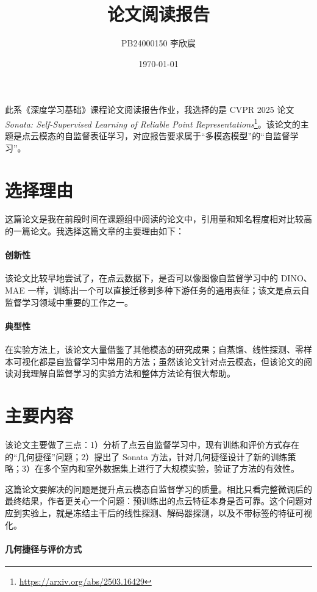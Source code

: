 \documentclass[a4paper,fontset=mac]{ctexart}
\title{论文阅读报告}
\author{PB24000150 李欣宸}
\date{\today}
\begin{document}
\maketitle

此系《深度学习基础》课程论文阅读报告作业，我选择的是 CVPR 2025 论文 {\it Sonata: Self-Supervised Learning of Reliable Point Representations}\footnote{\url{https://arxiv.org/abs/2503.16429}}。该论文的主题是点云模态的自监督表征学习，对应报告要求属于“多模态模型”的“自监督学习”。

\section{选择理由}

这篇论文是我在前段时间在课题组中阅读的论文中，引用量和知名程度相对比较高的一篇论文。我选择这篇文章的主要理由如下：

\paragraph{创新性} 该论文比较早地尝试了，在点云数据下，是否可以像图像自监督学习中的 DINO、MAE 一样，训练出一个可以直接迁移到多种下游任务的通用表征；该文是点云自监督学习领域中重要的工作之一。

\paragraph{典型性} 在实验方法上，该论文大量借鉴了其他模态的研究成果；自蒸馏、线性探测、零样本可视化都是自监督学习中常用的方法；虽然该论文针对点云模态，但该论文的阅读对我理解自监督学习的实验方法和整体方法论有很大帮助。

\section{主要内容}

该论文主要做了三点：1）分析了点云自监督学习中，现有训练和评价方式存在的“几何捷径”问题；2）提出了 Sonata 方法，针对几何捷径设计了新的训练策略；3）在多个室内和室外数据集上进行了大规模实验，验证了方法的有效性。

这篇论文要解决的问题是提升点云模态自监督学习的质量。相比只看完整微调后的最终结果，作者更关心一个问题：预训练出的点云特征本身是否可靠。这个问题对应到实验上，就是冻结主干后的线性探测、解码器探测，以及不带标签的特征可视化。

\paragraph{几何捷径与评价方式}
\end{document}
